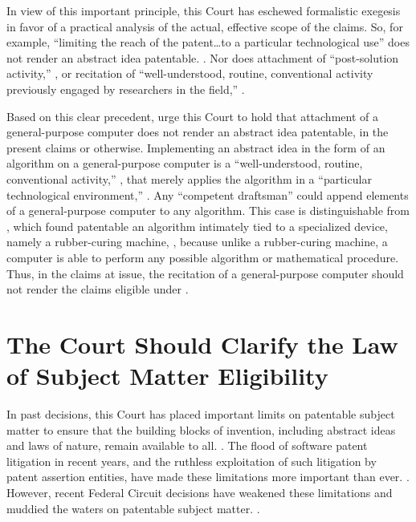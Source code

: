 \documentclass{scotus}
\begin{document}
In view of this important principle, this Court has eschewed
formalistic exegesis in favor of a practical analysis of the actual, effective
scope of the claims.
So, for example,
``limiting the reach of the patent\ldots to a
particular technological use'' does not render an abstract idea patentable.
. Nor does attachment of
``post-solution activity,''
,
or
recitation of ``well-understood, routine, conventional activity previously
engaged by researchers in the field,''
.

Based on this clear precedent, \amici urge this Court to hold that
attachment of a general-purpose computer does not render an abstract idea
patentable, in the present claims or otherwise.
Implementing an
abstract idea in the form of an algorithm on a general-purpose computer is a
``well-understood, routine, conventional activity,'' , that
merely
applies the algorithm in a ``particular technological environment,''
.
Any ``competent draftsman'' could append elements of a
general-purpose computer to any algorithm.
This case is distinguishable from , which found patentable an
algorithm intimately tied to a specialized device, namely a rubber-curing
machine, , because unlike a rubber-curing machine, a
computer is able to perform any possible algorithm or mathematical
procedure.
Thus, in the claims at issue, the recitation of a general-purpose computer
should not render the claims eligible under .



%
%
\section{The Court Should Clarify the Law of Subject Matter Eligibility}

In past decisions, this Court has placed important limits on patentable subject
matter to ensure that the building blocks of invention, including abstract ideas
and laws of nature, remain available to all. .  The flood
of software patent litigation in recent years, and the ruthless exploitation of
such litigation by patent assertion entities, have made these limitations more
important than ever. . However, recent Federal
Circuit decisions have weakened these limitations and muddied the waters on
patentable subject matter.  .
\end{document}

